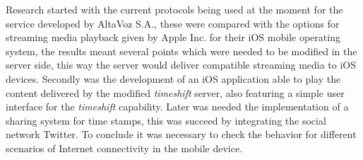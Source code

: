  


Research started with the current protocols being used at the moment for the service developed by AltaVoz S.A., these were compared with the options for streaming media playback given by Apple Inc. for their iOS mobile operating system, the results meant several points which were needed to be modified in the server side, this way the server would deliver compatible streaming media to iOS devices. Secondly was the development of an iOS application able to play the content delivered by the modified \textit{timeshift} server, also featuring a simple user interface for the \textit{timeshift} capability.
Later was needed the implementation of a sharing system for time stamps, this was succeed by integrating the social network Twitter. To conclude it was necessary to check the behavior for different scenarios of Internet connectivity in the mobile device. 
\\


